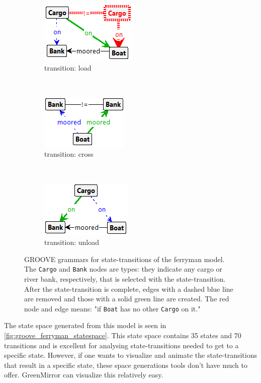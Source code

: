 \begin{figure}[h]
\centering
    \begin{subfigure}[b]{0.3\textwidth}
    \includegraphics{images/groove_ferryman_rule_load}
    \caption{transition: load}
    \label{fig:groove_ferryman_load}
    \end{subfigure}
    ~
    \begin{subfigure}[b]{0.3\textwidth}
    \includegraphics{images/groove_ferryman_rule_cross}
    \caption{transition: cross}
    \label{fig:groove_ferryman_cross}
    \end{subfigure}
    ~
    \begin{subfigure}[b]{0.3\textwidth}
    \includegraphics{images/groove_ferryman_rule_unload}
    \caption{transition: unload}
    \label{fig:groove_ferryman_unload}
    \end{subfigure}
\caption{GROOVE grammars for state-transitions of the ferryman model. The \texttt{Cargo} and \texttt{Bank} nodes are types: they indicate any cargo or river bank, respectively, that is selected with the state-transition. After the state-transition is complete, edges with a dashed blue line are removed and those with a solid green line are created. The red node and edge means: "if \texttt{Boat} has no other \texttt{Cargo} on it."}\label{fig:groove_ferryman}
\end{figure}
\par The state space generated from this model is seen in \cref{fig:groove_ferryman_statespace}. This state space contains 35 states and 70 transitions and is excellent for analysing state-transitions needed to get to a specific state. However, if one wants to visualize and animate the state-transitions that result in a specific state, these space generations tools don't have much to offer. GreenMirror can visualize this relatively easy. 
